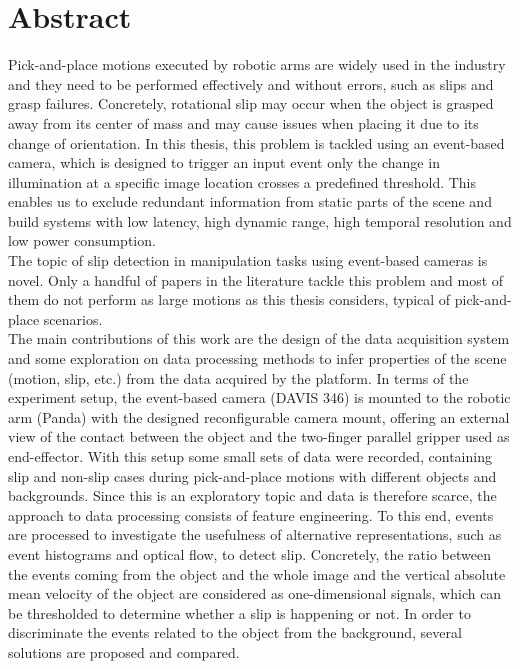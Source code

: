 \chapter*{Abstract}

Pick-and-place motions executed by robotic arms are widely used in the industry and they need to be performed effectively and without errors, such as slips and grasp failures. Concretely, rotational slip may occur when the object is grasped away from its center of mass and may cause issues when placing it due to its change of orientation. In this thesis, this problem is tackled using an event-based camera, which is designed to trigger an input event only the change in illumination at a specific image location crosses a predefined threshold. This enables us to exclude redundant information from static parts of the scene and build systems with low latency, high dynamic range, high temporal resolution and low power consumption.\\

The topic of slip detection in manipulation tasks using event-based cameras is novel. Only a handful of papers in the literature tackle this problem and most of them do not perform as large motions as this thesis considers, typical of pick-and-place scenarios.\\

The main contributions of this work are the design of the data acquisition system and some exploration on data processing methods to infer properties of the scene (motion, slip, etc.) from the data acquired by the platform. In terms of the experiment setup, the event-based camera (DAVIS 346) is mounted to the robotic arm (Panda) with the designed reconfigurable camera mount, offering an external view of the contact between the object and the two-finger parallel gripper used as end-effector. With this setup some small sets of data were recorded, containing slip and non-slip cases during pick-and-place motions with different objects and backgrounds. Since this is an exploratory topic and data is therefore scarce, the approach to data processing consists of feature engineering. To this end, events are processed to investigate the usefulness of alternative representations, such as event histograms and optical flow, to detect slip. Concretely, the ratio between the events coming from the object and the whole image and the vertical absolute mean velocity of the object are considered as one-dimensional signals, which can be thresholded to determine whether a slip is happening or not. In order to discriminate the events related to the object from the background, several solutions are proposed and compared.\\

